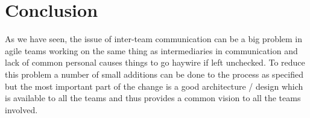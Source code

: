 \section{Conclusion} 
\label{sec:conclusion}
As we have seen, the issue of inter-team communication can be a big problem in agile teams working on the same thing as intermediaries in communication and lack of common personal causes things to go haywire if left unchecked. To reduce this problem a number of small additions can be done to the process as specified but the most important part of the change is a good architecture / design which is available to all the teams and thus provides a common vision to all the teams involved.